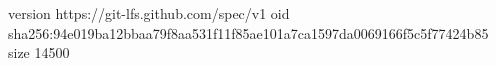 version https://git-lfs.github.com/spec/v1
oid sha256:94e019ba12bbaa79f8aa531f11f85ae101a7ca1597da0069166f5c5f77424b85
size 14500
